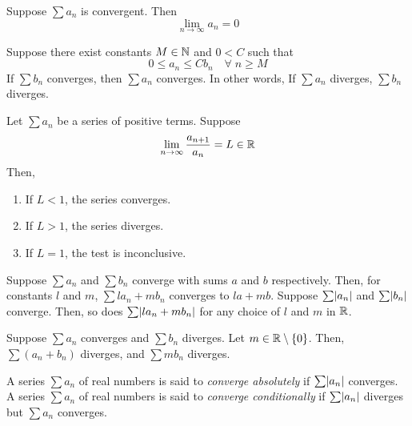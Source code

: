 \documentclass[12pt]{article}
\begin{document}
\begin{thm} \label{thm:series:convergent=>limit=0}
    Suppose $\sum a_{n}$ is convergent. Then \[
        \lim_{n \to \infty} a_{n} = 0
    \]
\end{thm}

\begin{thm} \label{thm:series:comparison}
    Suppose there exist constants $M \in \mathbb{N}$ and $0 < C$ such that \[
        0 \leq a_{n} \leq C b_{n} \quad\forall\; n \geq M
    \] If $\sum b_{n}$ converges, then $\sum a_{n}$ converges. In other words, If $\sum a_{n}$ diverges, $\sum b_{n}$ diverges.
\end{thm}

\begin{thm} \label{thm:series:ratio_test}
    Let $\sum a_{n}$ be a series of positive terms. Suppose \[
        \lim_{n \to \infty} \frac{a_{n+1}}{a_{n}} = L \in \mathbb{R}
    \] Then,
    \begin{enumerate}[label=(\alph*)]
        \item If $L < 1$, the series converges.
        \item If $L > 1$, the series diverges.
        \item If $L = 1$, the test is inconclusive.
    \end{enumerate}
\end{thm}

\begin{thm} \label{thm:series:limit_laws}
    Suppose $\sum a_{n}$ and $\sum b_{n}$ converge with sums $a$ and $b$ respectively.
    Then, for constants $l$ and $m$, $\sum la_{n} + mb_{n}$ converges to $la + mb$.
    Suppose $\sum \abs{a_{n}}$ and $\sum \abs{b_{n}}$ converge.
    Then, so does $\sum \abs{la_{n} + mb_{n}}$ for any choice of $l$ and $m$ in $\mathbb{R}$.
\end{thm}

\begin{cor} \label{thm:series:limit_laws:divergence}
    Suppose $\sum a_{n}$ converges and $\sum b_{n}$ diverges. Let $m \in \R \setminus \set{0}$. Then, $\sum(a_{n} + b_{n})$ diverges, and $\sum mb_{n}$ diverges.
\end{cor}

\begin{defn} \label{defn:series:absolute_convergence}
    A series $\sum a_{n}$ of real numbers is said to \emph{converge absolutely} if $\sum \abs{a_{n}}$ converges. A series $\sum a_{n}$ of real numbers is said to \emph{converge conditionally} if $\sum \abs{a_{n}}$ diverges but $\sum a_{n}$ converges.
\end{defn}
\end{document}
